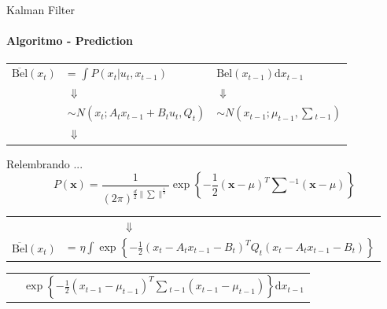 \documentclass[aspectratio=169]{beamer}
\begin{document}
\begin{frame}[c]{Kalman Filter}
    \framesubtitle{Algoritmo - Prediction}
    \begin{tabular}{p{1.5cm} l l}
        $\overline{\text{Bel}}(x_t)$  & = $\displaystyle\int P(x_t|u_t, x_{t-1})$ & $\text{Bel}(x_{t-1})\text{d}x_{t-1}$ \\
        & \quad\quad\quad\quad\quad $\Downarrow$ & \quad\quad\quad$\Downarrow$ \\
        & $\sim N\left(x_t; A_t x_{t-1}+ B_tu_t, Q_t\right)$ & $\sim N\left(x_{t-1}; \mu_{t-1}, \textstyle\sum {}_{t-1}\right)$ \\
        & \quad\quad\quad\quad\quad $\Downarrow$ & \\
    \end{tabular}
    \begin{block}{Relembrando ...}
        \begin{equation*}
            P(\mathbf{x}) = \frac{1}{(2\pi)^{\frac{d}{2}\|\sum\|^{\frac{1}{2}}}}\exp\left\{-\frac{1}{2} (\mathbf{x}-\mu)^T\textstyle\sum{}^{-1}(\mathbf{x}-\mu)\right\}
        \end{equation*}        
    \end{block}
    \begin{tabular}{p{1.2cm} l}
        & $\quad\quad\quad\quad\quad \Downarrow$\\
        $\overline{\text{Bel}}(x_t)$  & = $\eta \displaystyle\int \exp\left\{  -\frac{1}{2} \left(x_t - A_t x_{t-1} - B_t\right)^T Q_t \left(x_t - A_t x_{t-1} - B_t\right)  \right\}$ \\
    \end{tabular}
    \begin{tabular}{p{2.3cm} l}
        & $\exp\left\{ -\displaystyle\frac{1}{2} \left(x_{t-1} - \mu_{t-1}\right)^T \textstyle\sum {}_{t-1} \left(x_{t-1} - \mu_{t-1}\right)  \right\}\text{d}x_{t-1}$
    \end{tabular}    

\end{frame}
\end{document}
